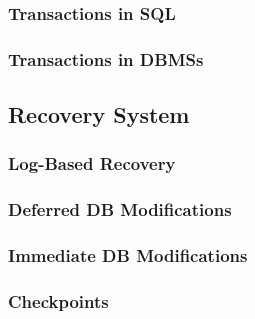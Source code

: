 \subsubsection{Transactions in SQL}
\subsubsection{Transactions in DBMSs}

\subsection{Recovery System}
\subsubsection{Log-Based Recovery}
\subsubsection{Deferred DB Modifications}
\subsubsection{Immediate DB Modifications}
\subsubsection{Checkpoints}